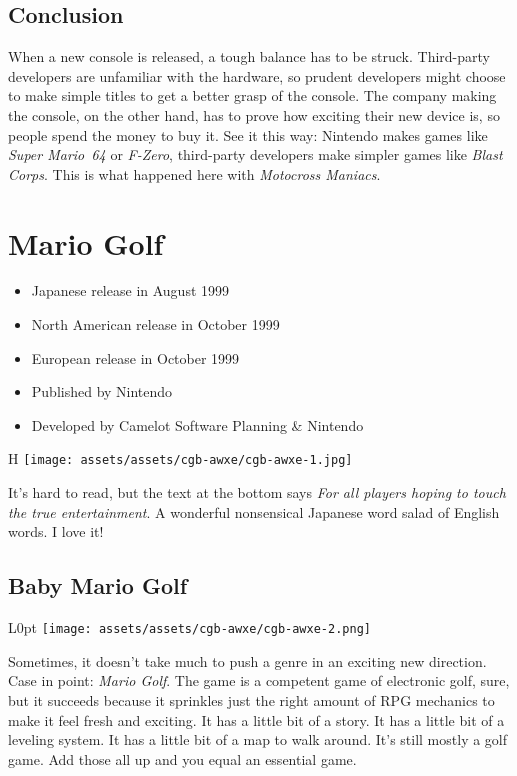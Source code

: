 \documentclass{book}
\begin{document}
\FloatBarrier\needspace{10mm}\section*{Conclusion}\nopagebreak[4]

When a new console is released, a tough balance has to be struck. Third-party developers are unfamiliar with the hardware, so prudent developers might choose to make simple titles to get a better grasp of the console. The company making the console, on the other hand, has to prove how exciting their new device is, so people spend the money to buy it. See it this way: Nintendo makes games like \emph{Super Mario 64} or \emph{F-Zero}, third-party developers make simpler games like \emph{Blast Corps}. This is what happened here with \emph{Motocross Maniacs}.


\begingroup \chapter*{Mario Golf} \endgroup

\begin{itemize} \setlength\itemsep{-0.4em}
\item Japanese release in August 1999
\item North American release in October 1999
\item European release in October 1999
\item Published by Nintendo
\item Developed by Camelot Software Planning \& Nintendo
\end{itemize}\noindent

\begin{wrapfigure}{H}{\linewidth}
\vskip 4pt
\centering \texttt{[image: assets/assets/cgb-awxe/cgb-awxe-1.jpg]}\par\pagetwodescription It’s hard to read, but the text at the bottom says \emph{For all players hoping to touch the true entertainment}. A wonderful nonsensical Japanese word salad of English words. I love it!\end{wrapfigure}
\clearpage

\FloatBarrier\needspace{10mm}\section*{Baby Mario Golf}\nopagebreak[4]

\begin{wrapfigure}{L}{0pt} \texttt{[image: assets/assets/cgb-awxe/cgb-awxe-2.png]}\end{wrapfigure}
Sometimes, it doesn’t take much to push a genre in an exciting new direction. Case in point: \emph{Mario Golf}. The game is a competent game of electronic golf, sure, but it succeeds because it sprinkles just the right amount of RPG mechanics to make it feel fresh and exciting. It has a little bit of a story. It has a little bit of a leveling system. It has a little bit of a map to walk around. It’s still mostly a golf game. Add those all up and you equal an essential game.
\end{document}
